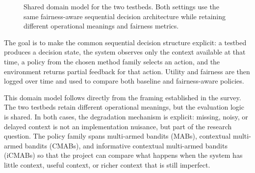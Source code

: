 \documentclass{IEEEtran}
\begin{document}
\begin{figure}[!t]
\centering
{}
\caption{Shared domain model for the two testbeds. Both settings use the same fairness-aware
sequential decision architecture while retaining different operational meanings and fairness
metrics.}
\label{fig:domain_model}
\end{figure}

The goal is to make the common sequential decision structure explicit: a testbed produces a
decision state, the system observes only the context available at that time, a policy from
the chosen method family selects an action, and the environment returns partial feedback for
that action. Utility and fairness are then logged over time and used to compare both
baseline and fairness-aware policies.

This domain model follows directly from the framing established in the survey. The two
testbeds retain different operational meanings, but the evaluation logic is shared. In both
cases, the degradation mechanism is explicit: missing, noisy, or delayed context is not an
implementation nuisance, but part of the research question. The policy family spans
multi-armed bandits (MABs), contextual multi-armed bandits (CMABs), and informative
contextual multi-armed bandits (iCMABs) so that the project can compare what happens
when the system has little context, useful context, or richer context that is still imperfect.
\end{document}
